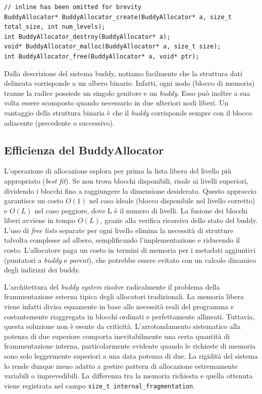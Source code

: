 \begin{lstlisting}
// inline has been omitted for brevity
BuddyAllocator* BuddyAllocator_create(BuddyAllocator* a, size_t total_size, int num_levels);
int BuddyAllocator_destroy(BuddyAllocator* a);
void* BuddyAllocator_malloc(BuddyAllocator* a, size_t size);
int BuddyAllocator_free(BuddyAllocator* a, void* ptr);
\end{lstlisting}

Dalla descrizione del sistema buddy, notiamo facilmente che la struttura dati delineata corrisponde a un albero binario. Infatti, ogni nodo (blocco di memoria) tranne la radice possiede un singolo genitore e un \textit{buddy}. Esso può inoltre a sua volta essere scomposto quando necessario in due ulteriori nodi liberi. Un vantaggio della struttura binaria è che il \textit{buddy} corrisponde sempre con il blocco adiacente (precedente o successivo).

\subsection*{Efficienza del BuddyAllocator}
L'operazione di allocazione esplora per prima la lista libera del livello più appropriato (\textit{best fit}). Se non trova blocchi disponibili, risale ai livelli superiori, dividendo i blocchi fino a raggiungere la dimensione desiderata. Questo approccio garantisce un costo $O(1)$ nel caso ideale (blocco disponibile nel livello corretto) e $O(L)$ nel caso peggiore, dove L è il numero di livelli. La fusione dei blocchi liberi avviene in tempo $O(L)$, grazie alla verifica ricorsiva dello stato del buddy. 
L'uso di \textit{free lists} separate per ogni livello elimina la necessità di strutture talvolta complesse ad albero, semplificando l'implementazione e riducendo il costo. L'allocatore paga un costo in termini di memoria per i metadati aggiuntivi (puntatori a \textit{buddy} e \textit{parent}), che potrebbe essere evitato con un calcolo dinamico degli indirizzi dei buddy. 

L’architettura del \textit{buddy system} risolve radicalmente il problema della frammentazione esterna tipica degli allocatori tradizionali. La memoria libera viene infatti divisa equamente in base alle necessità reali del programma e costantemente riaggregata in blocchi ordinati e perfettamente allineati. Tuttavia, questa soluzione non è esente da criticità. L'arrotondamento sistematico alla potenza di due superiore comporta inevitabilmente una certa quantità di frammentazione interna, particolarmente evidente quando le richieste di memoria sono solo leggermente superiori a una data potenza di due. La rigidità del sistema lo rende dunque meno adatto a gestire pattern di allocazione estremamente variabili o imprevedibili. La differenza tra la memoria richiesta e quella ottenuta viene registrata nel campo \lstinline|size_t internal_fragmentation|.

